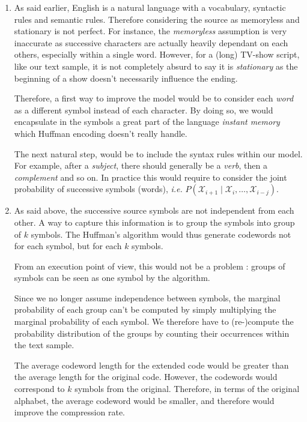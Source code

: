 \documentclass[a4paper, 12pt]{article}
\def\X{\mathcal{X}}
\begin{document}
\begin{enumerate}[leftmargin=*]
        \item As said earlier, English is a natural language with a vocabulary, syntactic rules and semantic rules. Therefore considering the source as memoryless and stationary is not perfect. For instance, the \emph{memoryless} assumption is very inaccurate as successive characters are actually heavily dependant on each others, especially within a single word. However, for a (long) TV-show script, like our text sample, it is not completely absurd to say it is \emph{stationary} as the beginning of a show doesn't necessarily influence the ending.
        
        Therefore, a first way to improve the model would be to consider each \emph{word} as a different symbol instead of each character. By doing so, we would encapsulate in the symbols a great part of the language \emph{instant memory} which Huffman encoding doesn't really handle.
        
        The next natural step, would be to include the syntax rules within our model. For example, after a \emph{subject}, there should generally be a \emph{verb}, then a \emph{complement} and so on. In practice this would require to consider the joint probability of successive symbols (words), \emph{i.e.} $P(\X_{i+1} \mid \X_{i}, \ldots, \X_{i - j})$.
        
        
        \item As said above, the successive source symbols are not independent from each other. A way to capture this information is to group the symbols into group of $k$ symbols. The Huffman's algorithm would thus generate codewords not for each symbol, but for each $k$ symbols.
        
        From an execution point of view, this would not be a problem : groups of symbols can be seen as one symbol by the algorithm.
        
        Since we no longer assume independence between symbols, the marginal probability of each group can't be computed by simply multiplying the marginal probability of each symbol. We therefore have to (re-)compute the probability distribution of the groups by counting their occurrences within the text sample.
        
        The average codeword length for the extended code would be greater than the average length for the original code. However, the codewords would correspond to $k$ symbols from the original. Therefore, in terms of the original alphabet, the average codeword would be smaller, and therefore would improve the compression rate.
        

\end{enumerate}
\end{document}
